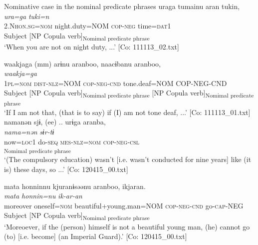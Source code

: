 \ea   Nominative case in the nominal predicate phrases \label{ex:9.64}
\ea \relax [= (5-9 b)]
    \gllll  uraga  tumainu  aran  tukin,\\
      \textit{ura=ga}  \textit{}  \textit{}  \textit{tuki=n}\\
      2.N\textsc{hon}.\textsc{sg}=\textsc{nom}  night.duty=NOM  \textsc{cop}-\textsc{neg}  time=\textsc{dat}1\\
      Subject  [NP  Copula verb]\textsubscript{Nomimal predicate phrase}  \\
      \glt       ‘When you are not on night duty, ...’ [Co: 111113\_02.txt]

\ex %
     \gllll waakjaga  (mm)  arɨnu  aranboo, naacɨbanu  aranboo,\\
      \textit{waakja=ga}    \textit{}  \textit{}  \textit{}  \textit{}\\                                                                  
      1\textsc{pl}=\textsc{nom}                  \textsc{dist}-\textsc{nlz}=NOM  \textsc{cop}-\textsc{neg}-\textsc{cnd}              tone.deaf=NOM  COP-NEG-CND\\
      Subject    [NP  Copula verb]\textsubscript{Nomimal predicate phrase} [NP  Copula verb]\textsubscript{Nomimal predicate phrase}\\
      \glt  ‘If I am not that, (that is to say) if (I) am not tone deaf, ...’   [Co: 111113\_01.txt]
\ex \label{ex:.c} %
    \gllll  namanən  sjɨ,  (ee)  ..  urɨga  aranba,\\
      \textit{nama=nən}  \textit{sɨr-tɨ}      \textit{}  \textit{}\\
      now=\textsc{loc}1  do-\textsc{seq}      \textsc{mes}-\textsc{nlz}=\textsc{nom}  \textsc{cop}-\textsc{neg}-\textsc{csl}\\
              [NP  Copula verb]\textsubscript{Nomimal predicate phrase}\\
      \glt       ‘(The compulsory education) wasn’t [i.e. wasn’t conducted for nine years] like (it is) these days, so ...’ [Co: 120415\_00.txt]

\ex  %
     \glll mata  {\textbar}honnin{\textbar}nu  kjuranɨsəənu   aranboo,  ikjaran.\\
      \textit{mata}  \textit{honnin=nu}  \textit{}  \textit{}  \textit{ik-ar-an}\\                                                                 
      moreover  oneself=\textsc{nom}  beautiful+young.man=NOM              \textsc{cop}-\textsc{neg}-\textsc{cnd}  go-\textsc{cap}-NEG\\
        Subject  [NP                                              Copula verb]\textsubscript{Nomimal predicate phrase}\\
    \glt ‘Moreoever, if the (person) himself is not a beautiful young man, (he) cannot go (to) [i.e. become] (an Imperial Guard).’   [Co: 120415\_00.txt]

